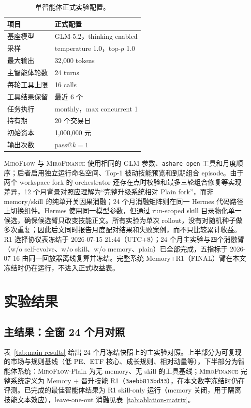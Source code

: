 \documentclass[11pt]{article}
\newcommand{\miroflow}{\textsc{MiroFlow}}
\newcommand{\memskill}{\textsc{MiroFinance}}
\begin{document}
\begin{table}[t]
\centering
\small
\begin{tabular}{@{}ll@{}}
\toprule
\textbf{项目} & \textbf{正式配置} \\
\midrule
基座模型 & GLM-5.2，thinking enabled \\
采样 & temperature 1.0，top-$p$ 1.0 \\
最大输出 & 32,000 tokens \\
主智能体轮数 & 24 turns \\
每轮工具上限 & 16 calls \\
工具结果保留 & 最近 6 个 \\
任务执行 & monthly，max concurrent 1 \\
持有期 & 20 个交易日 \\
初始资本 & 1,000,000 元 \\
输出次数 & pass@$k=1$ \\
\bottomrule
\end{tabular}
\caption{单智能体正式实验配置。}
\label{tab:config}
\end{table}

\miroflow{} 与 \memskill{} 使用相同的 GLM 参数、\texttt{ashare-open} 工具和月度顺序；后者启用独立运行命名空间、Top-1 被动技能预览和到期组合 episode。由于两个 workspace fork 的 orchestrator 还存在点时校验和最多三轮组合修复等实现差异，12 个月背景对照应理解为``完整升级系统相对 Plain fork''，而非 memory/skill 的纯单开关因果消融；24 个月消融矩阵则在同一 Hermes 代码路径上切换组件。Hermes 使用同一模型参数，但通过 run-scoped skill 目录物化单一候选，确保候选臂只改变技能正文。所有实验为单次 rollout，没有对随机种子做多次重复；因此后文同时报告月度配对结果和失败案例，而不只比较累计收益。
R1 选择协议表冻结于 2026-07-15 21:44（UTC+8）；24 个月主实验与四个消融臂（w/o self-evolve、w/o skill、w/o memory、plain）已全部完成，五指标于 2026-07-16 由同一回放器离线复算并冻结。完整系统 Memory+R1（FINAL）臂在本文冻结时仍在运行，不进入正式收益表。

\section{实验结果}
\label{sec:results}

\subsection{主结果：全窗 24 个月对照}
\label{sec:main-result}

表~\ref{tab:main-results} 给出 24 个月冻结快照上的主实验对照。上半部分为可复现的市场与规则基线（低 PE、ETF 核心、成长规则、相对动量等），下半部分为智能体系统：\miroflow{}-Plain 为无 memory、无 skill 的工具基线；\memskill{} 完整系统定义为 Memory + 晋升技能 R1（\texttt{3aebb813bd33}），在本文数字冻结时仍在评测。已完成的最佳智能体结果为 R1 skill-only 运行（memory 关闭，用于隔离技能文本效应），leave-one-out 消融见表~\ref{tab:ablation-matrix}。
\end{document}
